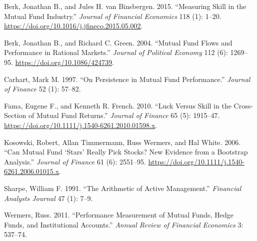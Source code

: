 \documentclass[
  letterpaper,
  DIV=11,
  numbers=noendperiod]{scrartcl}
\newlength{\cslhangindent}
\newenvironment{CSLReferences}[2] %
 {\begin{list}{}{%
  \setlength{\itemindent}{0pt}
  \setlength{\leftmargin}{0pt}
  \setlength{\parsep}{0pt}
  \ifodd #1
   \setlength{\leftmargin}{\cslhangindent}
   \setlength{\itemindent}{-1\cslhangindent}
  \fi
  \setlength{\itemsep}{#2\baselineskip}}}
 {\end{list}}
\begin{document}
\protect{}\label{refs}
\begin{CSLReferences}{1}{1}
Berk, Jonathan B., and Jules H. van Binsbergen. 2015. {``Measuring Skill
in the Mutual Fund Industry.''} \emph{Journal of Financial Economics}
118 (1): 1--20. \url{https://doi.org/10.1016/j.jfineco.2015.05.002}.

Berk, Jonathan B., and Richard C. Green. 2004. {``Mutual Fund Flows and
Performance in Rational Markets.''} \emph{Journal of Political Economy}
112 (6): 1269--95. \url{https://doi.org/10.1086/424739}.

Carhart, Mark M. 1997. {``On Persistence in Mutual Fund Performance.''}
\emph{Journal of Finance} 52 (1): 57--82.

Fama, Eugene F., and Kenneth R. French. 2010. {``Luck Versus Skill in
the Cross-Section of Mutual Fund Returns.''} \emph{Journal of Finance}
65 (5): 1915--47.
\url{https://doi.org/10.1111/j.1540-6261.2010.01598.x}.

Kosowski, Robert, Allan Timmermann, Russ Wermers, and Hal White. 2006.
{``Can Mutual Fund {`Stars'} Really Pick Stocks? New Evidence from a
Bootstrap Analysis.''} \emph{Journal of Finance} 61 (6): 2551--95.
\url{https://doi.org/10.1111/j.1540-6261.2006.01015.x}.

Sharpe, William F. 1991. {``The Arithmetic of Active Management.''}
\emph{Financial Analysts Journal} 47 (1): 7--9.

Wermers, Russ. 2011. {``Performance Measurement of Mutual Funds, Hedge
Funds, and Institutional Accounts.''} \emph{Annual Review of Financial
Economics} 3: 537--74.

\end{CSLReferences}
\end{document}
